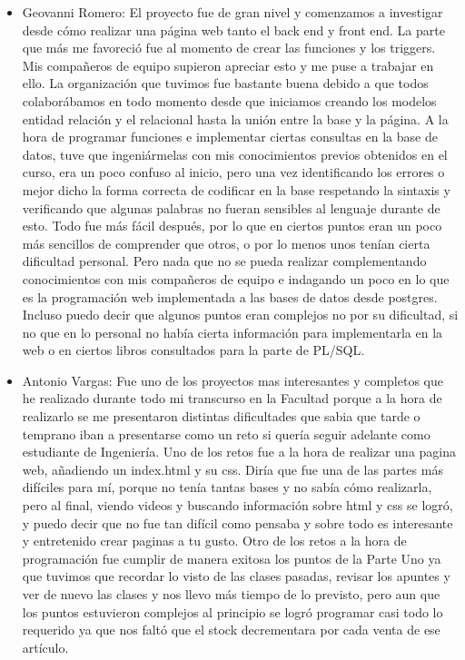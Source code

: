 \documentclass[letterpaper,12pt]{article}
\begin{document}
\begin{itemize}
		\item Geovanni Romero:
		El proyecto fue de gran nivel y comenzamos a investigar desde cómo realizar una página web tanto el back end y front end. La parte que más me favoreció fue al momento de crear las funciones y los triggers. Mis compañeros de equipo supieron apreciar esto y me puse a trabajar en ello. La organización que tuvimos fue bastante buena debido a que todos colaborábamos en todo momento desde que iniciamos creando los modelos entidad relación y el relacional hasta la unión entre la base y la página. A la hora de programar funciones e implementar ciertas consultas en la base de datos, tuve que ingeniármelas con mis conocimientos previos obtenidos en el curso, era un poco confuso al inicio, pero una vez identificando los errores o mejor dicho la forma correcta de codificar en la base respetando la sintaxis y verificando que algunas palabras no fueran sensibles al lenguaje durante de esto. Todo fue más fácil después, por lo que en ciertos puntos eran un poco más sencillos de comprender que otros, o por lo menos unos tenían cierta dificultad personal. Pero nada que no se pueda realizar complementando conocimientos con mis compañeros de equipo e indagando un poco en lo que es la programación web implementada a las bases de datos desde postgres. Incluso puedo decir que algunos puntos eran complejos no por su dificultad, si no que en lo personal no había cierta información para implementarla en la web o en ciertos libros consultados para la parte de PL/SQL.
		\item Antonio Vargas:
		Fue uno de los proyectos mas interesantes y completos que he realizado durante todo mi transcurso en la Facultad porque a la hora de realizarlo se me presentaron distintas dificultades que sabia que tarde o temprano iban a presentarse como un reto si quería seguir adelante como estudiante de Ingeniería. 
		Uno de los retos fue a la hora de realizar una pagina web, añadiendo un index.html y su css. Diría que fue una de las partes más difíciles para mí, porque no tenía tantas bases y no sabía cómo realizarla, pero al final, viendo videos y buscando información sobre html y css se logró, y puedo decir que no fue tan difícil como pensaba y sobre todo es interesante y entretenido crear paginas a tu gusto. 
		Otro de los retos a la hora de programación fue cumplir de manera exitosa los puntos de la Parte Uno ya que tuvimos que recordar lo visto de las clases pasadas, revisar los apuntes y ver de nuevo las clases y nos llevo más tiempo de lo previsto, pero aun que los puntos estuvieron complejos al principio se logró programar casi todo lo requerido ya que nos faltó que el stock decrementara por cada venta de ese artículo.    

\end{itemize}
\end{document}
